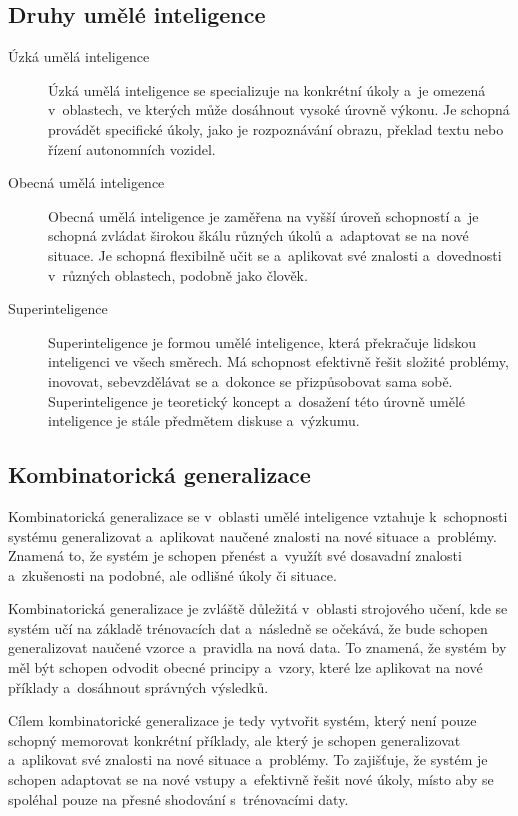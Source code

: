 \subsection{Druhy umělé inteligence}

\begin{description}
    \item[Úzká umělá inteligence] Úzká umělá inteligence se specializuje na konkrétní úkoly a~je omezená v~oblastech, ve kterých může dosáhnout vysoké úrovně výkonu. Je schopná provádět specifické úkoly, jako je rozpoznávání obrazu, překlad textu nebo řízení autonomních vozidel.
    \item[Obecná umělá inteligence] Obecná umělá inteligence je zaměřena na vyšší úroveň schopností a~je schopná zvládat širokou škálu různých úkolů a~adaptovat se na nové situace. Je schopná flexibilně učit se a~aplikovat své znalosti a~dovednosti v~různých oblastech, podobně jako člověk.
    \item[Superinteligence] Superinteligence je formou umělé inteligence, která překračuje lidskou inteligenci ve všech směrech. Má schopnost efektivně řešit složité problémy, inovovat, sebevzdělávat se a~dokonce se přizpůsobovat sama sobě. Superinteligence je teoretický koncept a~dosažení této úrovně umělé inteligence je stále předmětem diskuse a~výzkumu.
\end{description}

\subsection{Kombinatorická generalizace}

Kombinatorická generalizace se v~oblasti umělé inteligence vztahuje k~schopnosti systému generalizovat a~aplikovat naučené znalosti na nové situace a~problémy. Znamená to, že systém je schopen přenést a~využít své dosavadní znalosti a~zkušenosti na podobné, ale odlišné úkoly či situace.

Kombinatorická generalizace je zvláště důležitá v~oblasti strojového učení, kde se systém učí na základě trénovacích dat a~následně se očekává, že bude schopen generalizovat naučené vzorce a~pravidla na nová data. To znamená, že systém by měl být schopen odvodit obecné principy a~vzory, které lze aplikovat na nové příklady a~dosáhnout správných výsledků.

Cílem kombinatorické generalizace je tedy vytvořit systém, který není pouze schopný memorovat konkrétní příklady, ale který je schopen generalizovat a~aplikovat své znalosti na nové situace a~problémy. To zajišťuje, že systém je schopen adaptovat se na nové vstupy a~efektivně řešit nové úkoly, místo aby se spoléhal pouze na přesné shodování s~trénovacími daty.

